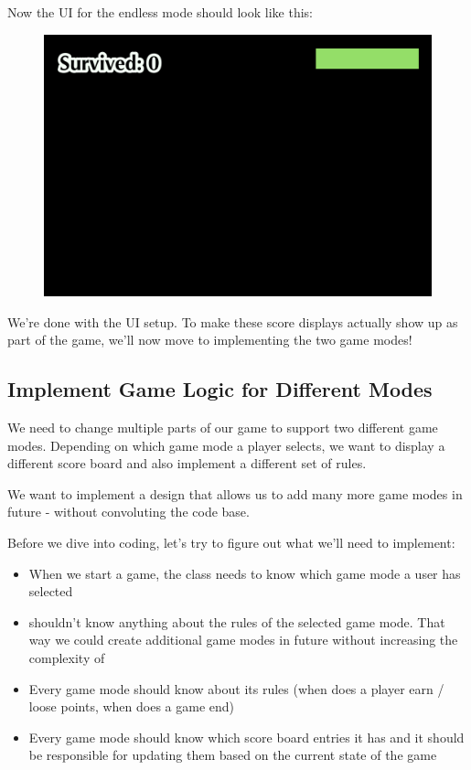 Now the UI for the endless mode should look like this:

\begin{figure}[H]
    \centering
    \includegraphics[width=0.5\linewidth]{images/Chapter7/endless_mode_ui.png}
\end{figure}

We're done with the UI setup. To make these score displays actually show up as
part of the game, we'll now move to implementing the two game modes!

\subsection{Implement Game Logic for Different Modes}
We need to change multiple parts of our game to support two different game
modes. Depending on which game mode a player selects, we want to display a
different score board and also implement a different set of rules.

We want to implement a design that allows us to add many more game modes in
future - without convoluting the code base.

Before we dive into coding, let's try to figure out what we'll need to
implement:
\begin{itemize}
  \item When we start a game, the  class needs to know
  which game mode a user has selected
  \item {} shouldn't know
  anything about the rules of the selected game mode. That way we could create
  additional game modes in future without increasing the complexity of
  \item Every game mode should know about its rules (when does a player earn /
  loose points, when does a game end)
  \item Every game mode should know which score board entries it has and it
  should be responsible for updating them based on the current state of the game
\end{itemize}

